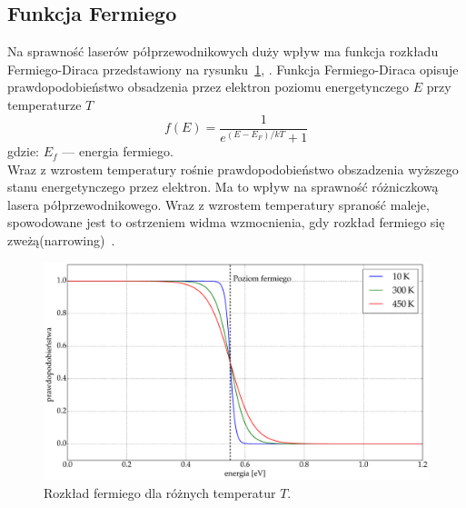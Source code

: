 \subsection{Funkcja Fermiego}
Na sprawność laserów półprzewodnikowych duży wpływ ma funkcja rozkładu Fermiego-Diraca przedstawiony na rysunku~\ref{fig:teoria_rys_3},
. Funkcja Fermiego-Diraca opisuje prawdopodobieństwo obsadzenia przez elektron poziomu
energetynczego $E$ przy temperaturze $T$
\begin{equation}
f(E) = \frac{1}{e^{(E-E_F)/kT} + 1}
\end{equation}
gdzie: $E_f$ --- energia fermiego. \\
Wraz z wzrostem temperatury rośnie prawdopodobieństwo obszadzenia wyższego stanu energetynczego przez elektron. Ma to
wpływ na sprawność różniczkową lasera półprzewodnikowego. Wraz z wzrostem temperatury spraność maleje, spowodowane jest to ostrzeniem
widma wzmocnienia, gdy rozkład fermiego się zweżą(narrowing)~\cite{publikacja_1}.
\begin{figure}[H]
\center
  \includegraphics[scale=0.30]{fermi.eps}
  \caption{Rozkład fermiego dla różnych temperatur $T$.}
  \label{fig:teoria_rys_3}
\end{figure}
\newpage
